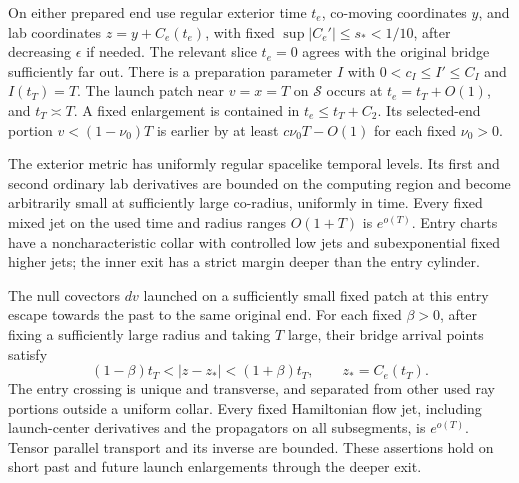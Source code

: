 \begin{proposition}
\label{bg:exterior}
On either prepared end use regular exterior time $t_e$, co-moving
coordinates $y$, and lab coordinates $z=y+C_e(t_e)$, with fixed
$\sup|C_e'|\le s_*<1/10$, after decreasing $\epsilon$ if needed.  The relevant slice $t_e=0$ agrees with the
original bridge sufficiently far out.  There is a preparation
parameter $I$ with $0<c_I\le I'\le C_I$ and $I(t_T)=T$.
The launch patch near $v=x=T$ on $\mathcal S$ occurs at
$t_e=t_T+O(1)$, and $t_T\asymp T$.  A fixed enlargement is
contained in $t_e\le t_T+C_2$.  Its selected-end portion
$v<(1-\nu_0)T$ is earlier by at least $c\nu_0T-O(1)$ for each
fixed $\nu_0>0$.

The exterior metric has uniformly regular spacelike temporal
levels.  Its first and second ordinary lab derivatives are bounded
on the computing region and become arbitrarily small at sufficiently
large co-radius, uniformly in time.  Every fixed mixed jet on the
used time and radius ranges $O(1+T)$ is $e^{o(T)}$.  Entry charts
have a noncharacteristic collar with controlled low jets and
subexponential fixed higher jets; the inner exit has a strict margin
deeper than the entry cylinder.

The null covectors $dv$ launched on a sufficiently small fixed patch
at this entry escape towards the past to the same original end.
For each fixed $\beta>0$, after fixing a sufficiently large radius
and taking $T$ large, their bridge arrival points satisfy
\begin{equation}\label{bg:arrival-shell}
 (1-\beta)t_T<|z-z_*|<(1+\beta)t_T,
                  \qquad z_*=C_e(t_T).
\end{equation}
The entry crossing is unique and transverse, and separated from
other used ray portions outside a uniform collar.  Every fixed
Hamiltonian flow jet, including launch-center derivatives and the
propagators on all subsegments, is $e^{o(T)}$.  Tensor parallel
transport and its inverse are bounded.  These assertions hold on
short past and future launch enlargements through the deeper exit.
\end{proposition}

